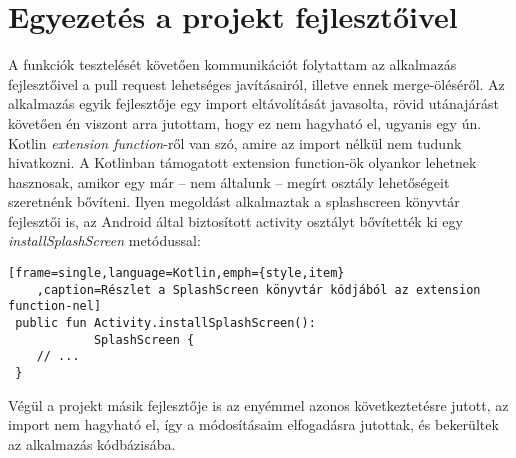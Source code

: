 \section{Egyezetés a projekt fejlesztőivel}
A funkciók tesztelését követően kommunikációt folytattam az alkalmazás fejlesztőivel a pull request \cite{pullrequest} lehetséges
javításairól, illetve ennek merge-öléséről. Az alkalmazás egyik fejlesztője egy import
eltávolítását javasolta, rövid utánajárást követően \cite{extensionfunction} én viszont arra jutottam, hogy ez nem
hagyható el, ugyanis egy ún. Kotlin \textit{extension function}-ről van szó, amire az import
nélkül nem tudunk hivatkozni. A Kotlinban támogatott extension function-ök olyankor lehetnek
hasznosak, amikor egy már -- nem általunk -- megírt osztály lehetőségeit szeretnénk bővíteni.
Ilyen megoldást alkalmaztak a \gls{splashscreen} könyvtár \cite{splashscreenreference} fejlesztői is, az Android által biztosított
\gls{activity} osztályt bővítették ki egy \textit{installSplashScreen} metódussal:

\begin{lstlisting}[frame=single,language=Kotlin,emph={style,item}
    ,caption=Részlet a SplashScreen könyvtár kódjából az extension function-nel]
 public fun Activity.installSplashScreen():
            SplashScreen {
    // ...
 }
\end{lstlisting}

Végül a projekt másik fejlesztője is az enyémmel azonos következtetésre jutott, az import
nem hagyható el, így a módosításaim elfogadásra jutottak, és bekerültek az alkalmazás kódbázisába.


